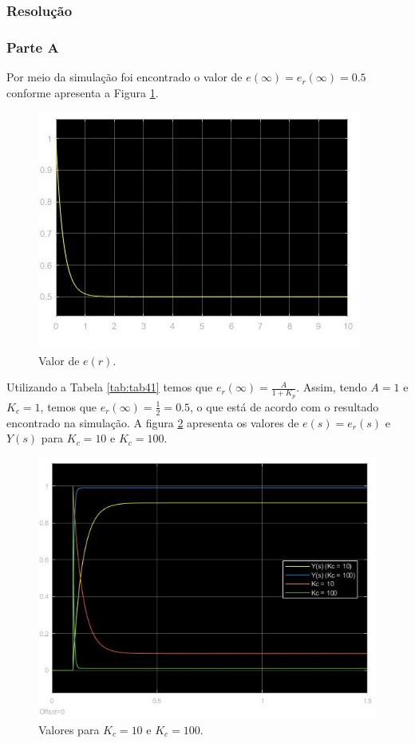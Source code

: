 \documentclass[
]{book}
\begin{document}
\hypertarget{resoluuxe7uxe3o-10}{%
\subsubsection*{Resolução}\label{resoluuxe7uxe3o-10}}

\hypertarget{parte-a-1}{%
\subsubsection*{Parte A}\label{parte-a-1}}

Por meio da simulação foi encontrado o valor de \(e(\infty) = e_r(\infty) = 0.5\) conforme apresenta a Figura \ref{fig:fig41A1}.

\begin{figure}
\includegraphics[width=0.8\linewidth]{Imagens/Lab4/Resolução/prob1A1} \caption{Valor de $e(r)$.}\label{fig:fig41A1}
\end{figure}

Utilizando a Tabela \ref{tab:tab41} temos que \(e_r(\infty)=\frac{A}{1 + K_p}\). Assim, tendo \(A = 1\) e \(K_c = 1\), temos que \(e_r(\infty) = \frac {1}{2} = 0.5\), o que está de acordo com o resultado encontrado na simulação. A figura \ref{fig:fig41A2} apresenta os valores de \(e(s) = e_r(s)\) e \(Y(s)\) para \(K_c = 10\) e \(K_c = 100\).

\begin{figure}
\includegraphics[width=0.8\linewidth]{Imagens/Lab4/Resolução/prob1A2} \caption{Valores para $K_c = 10$ e $K_c = 100$.}\label{fig:fig41A2}
\end{figure}
\end{document}
